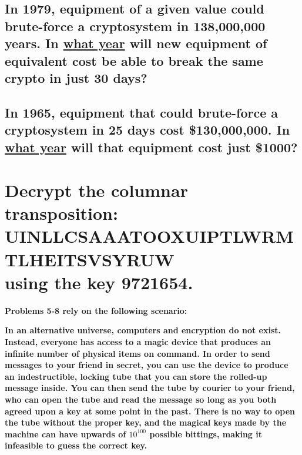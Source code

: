 \documentclass[12pt]{article}
\begin{document}
\newpage

\subsection{In 1979, equipment of a given value could brute-force a cryptosystem in 138,000,000 years.  In \underline{what year} will new equipment of equivalent cost be able to break the same crypto in just 30 days?}

\vspace{9cm}

\subsection{In 1965, equipment that could brute-force a cryptosystem in 25 days cost \$130,000,000.  In \underline{what year} will that equipment cost just \$1000?}

\newpage

\section{Decrypt the columnar transposition: \\ UINLLCSAAATOOXUIPTLWRMTLHEITSVSYRUW \\ using the key 9721654.}

\vspace{9cm}

\textbf{Problems 5-8 rely on the following scenario:}

\textbf{In an alternative universe, computers and encryption do not exist.  Instead, everyone has access to a magic device that produces an infinite number of physical items on command.  In order to send messages to your friend in secret, you can use the device to produce an indestructible, locking tube that you can store the rolled-up message inside.  You can then send the tube by courier to your friend, who can open the tube and read the message so long as you both agreed upon a key at some point in the past.  There is no way to open the tube without the proper key, and the magical keys made by the machine can have upwards of $10^{100}$ possible bittings, making it infeasible to guess the correct key.}
\end{document}
